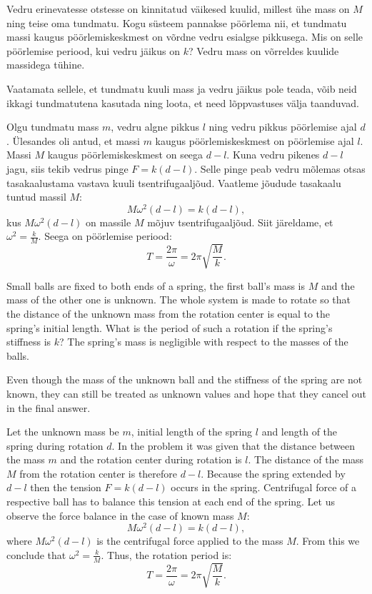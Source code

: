 
Vedru erinevatesse otstesse on kinnitatud väikesed kuulid, millest ühe mass on $M$ ning teise oma tundmatu. Kogu süsteem pannakse pöörlema nii, et tundmatu massi kaugus pöörlemiskeskmest on võrdne vedru esialgse pikkusega. Mis on selle pöörlemise periood, kui vedru jäikus on $k$? Vedru mass on võrreldes kuulide massidega tühine.

\hint
Vaatamata sellele, et tundmatu kuuli mass ja vedru jäikus pole teada, võib neid ikkagi tundmatutena kasutada ning loota, et need lõppvastuses välja taanduvad.

\solu
Olgu tundmatu mass $m$, vedru algne pikkus $l$ ning vedru pikkus pöörlemise ajal $d$. Ülesandes oli antud, et massi $m$ kaugus pöörlemiskeskmest on pöörlemise ajal $l$. Massi $M$ kaugus pöörlemiskeskmest on seega $d-l$.
Kuna vedru pikenes $d-l$ jagu, siis tekib vedrus pinge $F=k(d-l)$. Selle pinge peab vedru mõlemas otsas tasakaalustama vastava kuuli tsentrifugaaljõud. Vaatleme jõudude tasakaalu tuntud massil $M$:
\begin{equation*}
M\omega^2(d-l)=k(d-l),
\end{equation*}
kus $M\omega^2(d-l)$ on massile $M$ mõjuv tsentrifugaaljõud.
Siit järeldame, et $\omega^2=\frac{k}{M}$. Seega on pöörlemise periood:
\begin{equation*}
T=\frac{2\pi}{\omega}=2\pi \sqrt{\frac{M}{k}}.
\end{equation*}

Small balls are fixed to both ends of a spring, the first ball’s mass is $M$ and the mass of the other one is unknown. The whole system is made to rotate so that the distance of the unknown mass from the rotation center is equal to the spring’s initial length. What is the period of such a rotation if the spring’s stiffness is $k$? The spring’s mass is negligible with respect to the masses of the balls.

\hinteng
Even though the mass of the unknown ball and the stiffness of the spring are not known, they can still be treated as unknown values and hope that they cancel out in the final answer.

\solueng
Let the unknown mass be $m$, initial length of the spring $l$ and length of the spring during rotation $d$. In the problem it was given that the distance between the mass $m$ and the rotation center during rotation is $l$. The distance of the mass $M$ from the rotation center is therefore $d-l$. Because the spring extended by $d-l$ then the tension $F=k(d-l)$ occurs in the spring. Centrifugal force of a respective ball has to balance this tension at each end of the spring. Let us observe the force balance in the case of known mass $M$:
\begin{equation*}
M\omega^2(d-l)=k(d-l),
\end{equation*} 
where $M\omega^2(d-l)$ is the centrifugal force applied to the mass $M$. From this we conclude that $\omega^2=\frac{k}{M}$. Thus, the rotation period is:
\begin{equation*}
T=\frac{2\pi}{\omega}=2\pi \sqrt{\frac{M}{k}}.
\end{equation*}
\probend